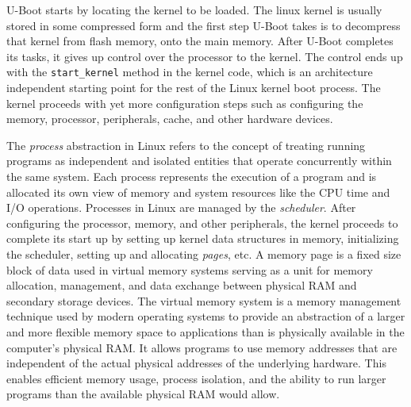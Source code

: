 U-Boot starts by locating the kernel to be loaded. The linux kernel is usually stored in some compressed form and the first step U-Boot takes is to decompress that kernel from flash memory, onto the main memory. After U-Boot completes its tasks, it gives up control over the processor to the kernel. The control ends up with the \texttt{start\_kernel} method in the kernel code, which is an architecture independent starting point for the rest of the Linux kernel boot process. The kernel proceeds with yet more configuration steps such as configuring the memory, processor, peripherals, cache, and other hardware devices.

The \textit{process} abstraction in Linux refers to the concept of treating running programs as independent and isolated entities that operate concurrently within the same system. Each process represents the execution of a program and is allocated its own view of memory and system resources like the CPU time and I/O operations. Processes in Linux are managed by the \textit{scheduler}. After configuring the processor, memory, and other peripherals, the kernel proceeds to complete its start up by setting up kernel data structures in memory, initializing the scheduler, setting up and allocating \textit{pages}, etc. A memory page is a fixed size block of data used in virtual memory systems serving as a unit for memory allocation, management, and data exchange between physical RAM and secondary storage devices. The virtual memory system is a memory management technique used by modern operating systems to provide an abstraction of a larger and more flexible memory space to applications than is physically available in the computer's physical RAM. It allows programs to use memory addresses that are independent of the actual physical addresses of the underlying hardware. This enables efficient memory usage, process isolation, and the ability to run larger programs than the available physical RAM would allow.

\begin{figure}[h]
	\centering
\end{figure}

